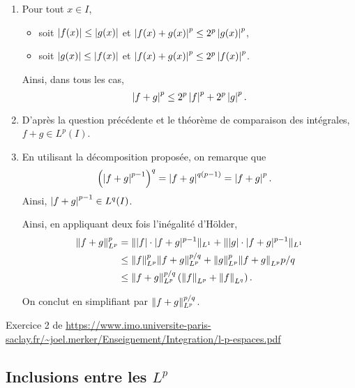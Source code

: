 \begin{demo}
\begin{enumerate}
\item Pour tout $x \in I$,
\begin{itemize}
\item soit $\left| f(x) \right| \leq \left| g(x) \right|$ et $\left| f(x) + g(x) \right|^p \leq 2^p \left| g(x) \right|^p$,
\item soit $\left| g(x) \right| \leq \left| f(x) \right|$ et $\left| f(x) + g(x) \right|^p \leq 2^p \left| f(x) \right|^p$.
\end{itemize}
Ainsi, dans tous les cas,
\[
\left| f + g \right|^p \leq 2^p \left| f \right|^p + 2^p \left| g \right|^p.
\]

\item D'après la question précédente et le théorème de comparaison des intégrales, $f + g \in L^p(I)$.

\item En utilisant la décomposition proposée, on remarque que
\begin{align*}
\left(\left| f + g \right|^{p-1}\right)^q
&= \left| f + g \right|^{q(p-1)}
= \left| f + g \right|^p.
\end{align*}
Ainsi, $\left| f + g \right|^{p-1} \in L^q(I)$.

Ainsi, en appliquant deux fois l'inégalité d'Hölder,
\begin{align*}
\Vert f + g \Vert_{L^p}^p
&= \Vert |f| \cdot |f + g|^{p-1} \Vert_{L^1}
+ \Vert |g| \cdot |f + g|^{p-1} \Vert_{L^1}\\
&\leq \norm{f}_{L^p}^p \norm{f + g}_{L^p}^{p/q}
+ \norm{g}_{L^p}^p \norm{f + g}_{L^p}{p/q}\\
&\leq \norm{f + g}_{L^p}^{p/q} \left(\norm{f}_{L^p} + \norm{f}_{L^q}\right).
\end{align*}

On conclut en simplifiant par $\norm{f + g}_{L^p}^{p/q}$.
\end{enumerate}
\end{demo}

Exercice 2 de \url{https://www.imo.universite-paris-saclay.fr/~joel.merker/Enseignement/Integration/l-p-espaces.pdf}

\subsection{Inclusions entre les $L^p$}

